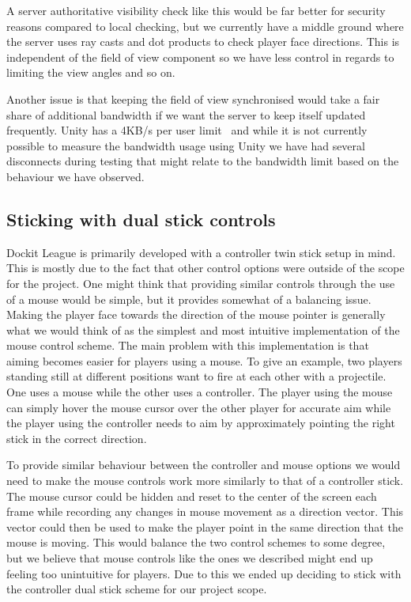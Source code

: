 A server authoritative visibility check like this would be far better for security reasons compared to local checking, but we currently have a middle ground where the server uses ray casts and dot products to check player face directions. This is independent of the field of view component so we have less control in regards to limiting the view angles and so on.

Another issue is that keeping the field of view synchronised would take a fair share of additional bandwidth if we want the server to keep itself updated frequently. Unity has a 4KB/s per user limit~\cite{unityNetworkBandwidthLimit} and while it is not currently possible to measure the bandwidth usage using Unity we have had several disconnects during testing that might relate to the bandwidth limit based on the behaviour we have observed.


\subsection{Sticking with dual stick controls}
Dockit League is primarily developed with a controller twin stick setup in mind. This is mostly due to the fact that other control options were outside of the scope for the project. One might think that providing similar controls through the use of a mouse would be simple, but it provides somewhat of a balancing issue. 
Making the player face towards the direction of the mouse pointer is generally what we would think of as the simplest and most intuitive implementation of the mouse control scheme. The main problem with this implementation is that aiming becomes easier for players using a mouse. To give an example, two players standing still at different positions want to fire at each other with a projectile. One uses a mouse while the other uses a controller. The player using the mouse can simply hover the mouse cursor over the other player for accurate aim while the player using the controller needs to aim by approximately pointing the right stick in the correct direction.  

To provide similar behaviour between the controller and mouse options we would need to make the mouse controls work more similarly to that of a controller stick. The mouse cursor could be hidden and reset to the center of the screen each frame while recording any changes in mouse movement as a direction vector. This vector could then be used to make the player point in the same direction that the mouse is moving. This would balance the two control schemes to some degree, but we believe that mouse controls like the ones we described might end up feeling too unintuitive for players. Due to this we ended up deciding to stick with the controller dual stick scheme for our project scope. 

